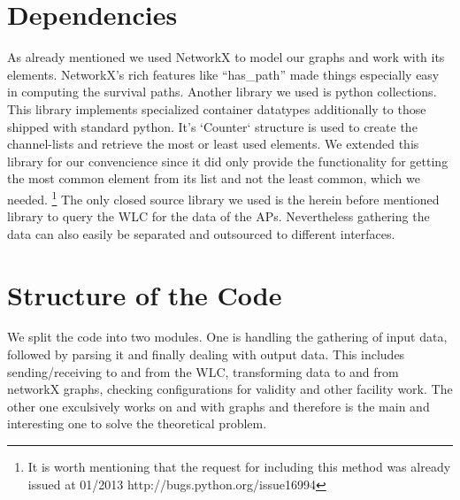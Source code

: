   \section{Dependencies}
    As already mentioned we used NetworkX\cite{hagberg-2008-exploring} to model our graphs and work with its elements.
    NetworkX's rich features like ``has\_path'' made things especially easy in computing the survival paths.
    Another library we used is python collections. \cite{python_collections}
    This library implements specialized container datatypes additionally to those shipped with standard python.
    It's `Counter` structure is used to create the channel-lists and retrieve the most or least used elements.
    We extended this library for our convencience since it did only provide the functionality for getting the most common element from its list and not the least common,
    which we needed. \footnote{It is worth mentioning that the request for including this method was already issued at 01/2013 http://bugs.python.org/issue16994}
    The only closed source library we used is the herein before mentioned library to query the WLC for the data of the APs. Nevertheless gathering the data can also
    easily be separated and outsourced to different interfaces.
  
  \section{Structure of the Code}
    We split the code into two modules. One is handling the gathering of input data, followed by parsing it and finally dealing with output data.
    This includes sending/receiving to and from the \ac{WLC}, transforming data to and from networkX graphs, checking configurations for validity and other facility work.
    The other one exculsively works on and with graphs and therefore is the main and interesting one to solve the theoretical problem.
    
